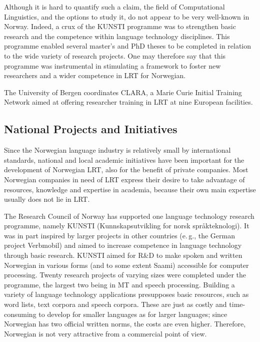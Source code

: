 \begin{multicols}{2}

Although it is hard to quantify such a claim, the field of Computational Linguistics, and the options to study it, do not appear to be very well-known in Norway. 
Indeed, a crux of the KUNSTI programme was to strengthen basic research and the competence within language technology disciplines. %
This programme enabled several master's and PhD theses to be completed in relation to the wide variety of research projects. 
One may therefore say that this programme was instrumental in stimulating a framework to foster new researchers and a wider competence in LRT for Norwegian.

The University of Bergen coordinates CLARA, a Marie Curie Initial Training Network aimed at offering researcher training in LRT at nine European facilities.

\subsection{National Projects and Initiatives}

Since the Norwegian language industry is relatively small by international standards, national and local academic initiatives have been important for the development of Norwegian LRT, also for the benefit of private companies.
Most Norwegian companies in need of LRT express their desire to take advantage of resources, knowledge and expertise in academia, because their own main expertise usually does not lie in LRT.

The Research Council of Norway has supported one language technology research programme, namely KUNSTI (Kunnskapsutvikling for norsk språkteknologi).
It was in part inspired by larger projects in other countries (e.\,g.,
the German project Verbmobil) and aimed to increase competence in language technology through basic research. 
KUNSTI aimed for R\&D to make spoken and written Norwegian in various forms (and to some extent Saami) accessible for computer processing. 
Twenty research projects of varying sizes were completed under the programme, the largest two being in MT and speech processing. Building a variety of language technology applications presupposes basic resources, such as word lists, text corpora and speech corpora. 
These are just as costly and time-consuming to develop for smaller languages as for larger languages; since Norwegian has two official written norms, the costs are even higher. 
Therefore, Norwegian is not very attractive from a commercial point of view. 


\end{multicols}
